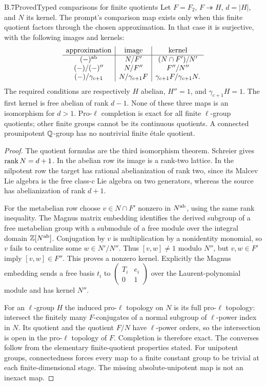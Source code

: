 \begin{statement}{B.7}{Proved}{Typed comparisons for finite quotients}
Let $F=F_2$, $F\twoheadrightarrow H$, $d=|H|$, and $N$ its kernel.
The prompt's comparison map exists only when this finite quotient
factors through the chosen approximation. In that case it is
surjective, with the following images and kernels:
\[
\begin{array}{c|c|c}
\text{approximation}&\text{image}&\text{kernel}\\ \hline
(-)^{\mathrm{ab}}&N/F'&(N\cap F')/N'\\
(-)/(-)''&N/F''&F''/N''\\
(-)/\gamma_{c+1}&N/\gamma_{c+1}F&
                    \gamma_{c+1}F/\gamma_{c+1}N .
\end{array}
\]
The required conditions are respectively $H$ abelian, $H''=1$,
and $\gamma_{c+1}H=1$. The first kernel is free abelian of rank
$d-1$. None of these three maps is an isomorphism for $d>1$.
Pro-$\ell$ completion is exact for all finite $\ell$-group
quotients; other finite groups cannot be its continuous quotients.
A connected prounipotent $\mathbb Q$-group has no nontrivial finite
étale quotient.
\end{statement}
\begin{proof}
The quotient formulas are the third isomorphism theorem.
Schreier gives $\operatorname{rank} N=d+1$. In the abelian row its image is
a rank-two lattice. In the nilpotent row the target has
rational abelianization of rank two, since its Malcev Lie algebra
is the free class-$c$ Lie algebra on two generators, whereas the
source has abelianization of rank $d+1$.

For the metabelian row choose $v\in N\cap F'$ nonzero in
$N^{\mathrm{ab}}$, using the same rank inequality. The Magnus matrix
embedding identifies the derived subgroup of a free metabelian
group with a submodule of a free module over the integral domain
$\mathbb Z[N^{\mathrm{ab}}]$. Conjugation by $v$ is multiplication by a
nonidentity monomial, so $v$ fails to centralize some
$w\in N'/N''$. Thus $[v,w]\ne1$ modulo $N''$, but
$v,w\in F'$ imply $[v,w]\in F''$. This proves a nonzero kernel.
Explicitly the Magnus embedding sends a free basis $t_i$ to
$\left(\begin{smallmatrix}T_i&e_i\\0&1\end{smallmatrix}\right)$
over the Laurent-polynomial module and has kernel $N''$.

For an $\ell$-group $H$ the induced pro-$\ell$ topology on $N$
is its full pro-$\ell$ topology: intersect the finitely many
$F$-conjugates of a normal subgroup of $\ell$-power index in
$N$. Its quotient and the quotient $F/N$ have $\ell$-power
orders, so the intersection is open in the pro-$\ell$ topology
of $F$. Completion is therefore exact. The converses follow
from the elementary finite-quotient properties stated. For
unipotent groups, connectedness forces every map to a finite
constant group to be trivial at each finite-dimensional stage.
The missing absolute-unipotent map is not an inexact map.
\end{proof}

